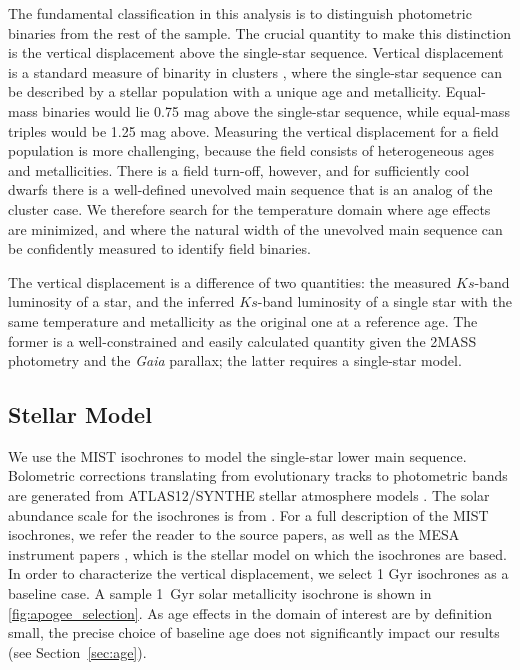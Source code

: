 \documentclass[twocolumn]{aastex6}
\newcommand{\Gaia}{\mbox{\textit{Gaia}}}
\begin{document}
The fundamental classification in this analysis is to distinguish photometric
binaries from the rest of the sample. The crucial quantity to make this
distinction is the 
vertical displacement above the single-star sequence. Vertical 
displacement is a standard measure of binarity in clusters 
\citep{Mermilliod92}, where the single-star sequence can be described by a
stellar population with a unique age and metallicity. Equal-mass binaries
would lie 0.75 mag above the single-star sequence, while equal-mass triples would be
1.25 mag above. Measuring the vertical displacement for a field population is 
more challenging, because the
field consists of heterogeneous ages and metallicities. There is a
field turn-off, however, and for sufficiently cool dwarfs there is a
well-defined unevolved main sequence that is an analog of the cluster case. We
therefore search for the temperature domain where age effects are minimized, 
and where the natural width of the unevolved main sequence can be confidently
measured to identify field binaries.

The vertical displacement is a difference of two quantities: the measured 
\(Ks\)-band luminosity of a star, and the inferred \(Ks\)-band luminosity of a 
single star with the same temperature and metallicity as the original one at a 
reference age. The former is a well-constrained and easily calculated quantity 
given the 2MASS photometry and the \Gaia{} parallax; the latter requires a 
single-star model.

\subsection{Stellar Model}

We use the MIST \citep{Dotter16,Choi16} isochrones to model the 
single-star lower main sequence. Bolometric corrections translating from
evolutionary tracks to photometric bands are generated from ATLAS12/SYNTHE
stellar atmosphere models \citep{Kurucz70,Kurucz93}. The solar abundance scale
for the isochrones is from \citet{Asplund09}. For a full description of the 
MIST isochrones, we refer the reader to the source papers, as well as the MESA 
instrument papers \citep{Paxton11, Paxton13, Paxton15}, which is the stellar 
model on which the isochrones are based. In order to characterize the vertical 
displacement, we select 1 Gyr isochrones
as a baseline case. A sample 1~Gyr solar metallicity isochrone is shown in
\cref{fig:apogee_selection}. As age effects in the domain of interest are 
by definition small, the precise choice of baseline age does not significantly impact our 
results (see Section~\ref{sec:age}).
\end{document}
